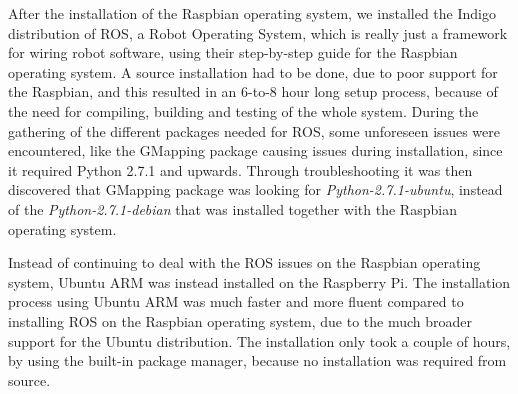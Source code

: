 After the installation of the Raspbian operating system, we installed the Indigo distribution of ROS, a Robot Operating System, which is really just a framework for wiring robot software, using their step-by-step guide for the Raspbian operating system\cite{indigoins}.
A source installation had to be done, due to poor support for the Raspbian, and this resulted in an 6-to-8 hour long setup process, because of the need for compiling, building and testing of the whole system. 
During the gathering of the different packages needed for ROS, some unforeseen issues were encountered, like the GMapping package causing issues during installation, since it required Python 2.7.1 and upwards. Through troubleshooting it was then discovered that GMapping package was looking for \textit{Python-2.7.1-ubuntu}, instead of the \textit{Python-2.7.1-debian} that was installed together with the Raspbian operating system.

Instead of continuing to deal with the ROS issues on the Raspbian operating system, Ubuntu ARM was instead installed on the Raspberry Pi\cite{ubuntuins}.
The installation process using Ubuntu ARM was much faster and more fluent compared to installing ROS on the Raspbian operating system, due to the much broader support for the Ubuntu distribution. The installation only took a couple of hours, by using the built-in package manager, because no installation was required from source\cite{ubuntuROS}.

